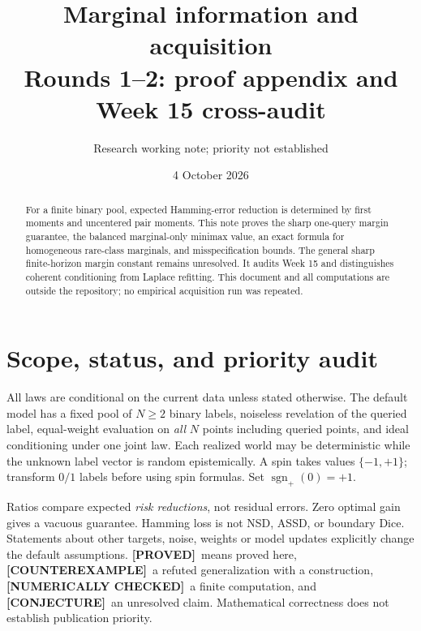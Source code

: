 \documentclass[11pt]{article}
\title{Marginal information and acquisition\\Rounds 1--2: proof appendix and Week 15 cross-audit}
\author{Research working note; priority not established}
\date{4 October 2026}
\theoremstyle{definition}
\newcommand{\1}{\mathbf 1}
\newcommand{\sg}{\operatorname{sgn}_{+}}
\newcommand{\pr}{\textbf{[PROVED]}}
\newcommand{\ce}{\textbf{[COUNTEREXAMPLE]}}
\newcommand{\nc}{\textbf{[NUMERICALLY CHECKED]}}
\newcommand{\cj}{\textbf{[CONJECTURE]}}
\begin{document}
\maketitle
\begin{abstract}
For a finite binary pool, expected Hamming-error reduction is determined by
first moments and uncentered pair moments. This note proves the sharp one-query
margin guarantee, the balanced marginal-only minimax value, an exact formula
for homogeneous rare-class marginals, and misspecification bounds.
The general sharp finite-horizon margin constant remains unresolved.
It audits Week 15 and distinguishes coherent conditioning from Laplace
refitting. This document and all computations are outside the repository;
no empirical acquisition run was repeated.
\end{abstract}
\tableofcontents
\section{Scope, status, and priority audit}
All laws are conditional on the current data unless stated otherwise.
The default model has a fixed pool of $N\ge2$ binary labels, noiseless
revelation of the queried label, equal-weight evaluation on \emph{all} $N$
points including queried points, and ideal conditioning under one joint law.
Each realized world may be deterministic while the unknown label vector is
random epistemically. A spin takes values $\{-1,+1\}$; transform $0/1$ labels
before using spin formulas. Set $\sg(0)=+1$.

Ratios compare expected \emph{risk reductions}, not residual errors.
Zero optimal gain gives a vacuous guarantee. Hamming loss is not NSD, ASSD,
or boundary Dice. Statements about other targets, noise, weights or model
updates explicitly change the default assumptions.
\pr\ means proved here, \ce\ a refuted generalization with a construction,
\nc\ a finite computation, and \cj\ an unresolved claim.
Mathematical correctness does not establish publication priority.
\end{document}
